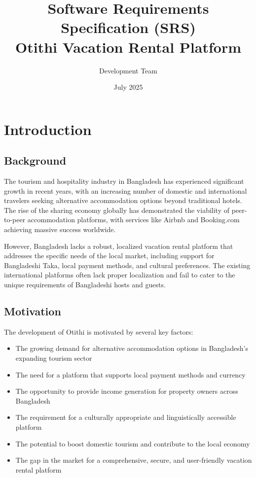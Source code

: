 \documentclass[12pt,a4paper]{report}
\title{Software Requirements Specification (SRS)\\Otithi Vacation Rental Platform}
\author{Development Team}
\date{July 2025}
\begin{document}
\maketitle

\tableofcontents
\newpage

\chapter{Introduction}

\section{Background}
The tourism and hospitality industry in Bangladesh has experienced significant growth in recent years, with an increasing number of domestic and international travelers seeking alternative accommodation options beyond traditional hotels. The rise of the sharing economy globally has demonstrated the viability of peer-to-peer accommodation platforms, with services like Airbnb and Booking.com achieving massive success worldwide.

However, Bangladesh lacks a robust, localized vacation rental platform that addresses the specific needs of the local market, including support for Bangladeshi Taka, local payment methods, and cultural preferences. The existing international platforms often lack proper localization and fail to cater to the unique requirements of Bangladeshi hosts and guests.

\section{Motivation}
The development of Otithi is motivated by several key factors:

\begin{itemize}
    \item The growing demand for alternative accommodation options in Bangladesh's expanding tourism sector
    \item The need for a platform that supports local payment methods and currency
    \item The opportunity to provide income generation for property owners across Bangladesh
    \item The requirement for a culturally appropriate and linguistically accessible platform
    \item The potential to boost domestic tourism and contribute to the local economy
    \item The gap in the market for a comprehensive, secure, and user-friendly vacation rental platform
\end{itemize}
\end{document}
